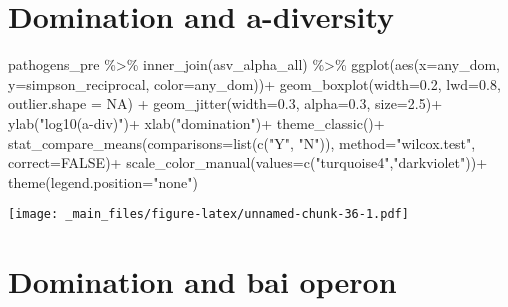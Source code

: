 \documentclass[
]{book}
\newenvironment{Shaded}{\begin{snugshade}}{\end{snugshade}}
\newcommand{\AttributeTok}[1]{\textcolor[rgb]{0.77,0.63,0.00}{#1}}
\newcommand{\ConstantTok}[1]{\textcolor[rgb]{0.00,0.00,0.00}{#1}}
\newcommand{\FloatTok}[1]{\textcolor[rgb]{0.00,0.00,0.81}{#1}}
\newcommand{\FunctionTok}[1]{\textcolor[rgb]{0.00,0.00,0.00}{#1}}
\newcommand{\NormalTok}[1]{#1}
\newcommand{\SpecialCharTok}[1]{\textcolor[rgb]{0.00,0.00,0.00}{#1}}
\newcommand{\StringTok}[1]{\textcolor[rgb]{0.31,0.60,0.02}{#1}}
\begin{document}
\hypertarget{domination-and-a-diversity}{%
\section{Domination and a-diversity}\label{domination-and-a-diversity}}

\begin{Shaded}
\begin{Highlighting}[]
\NormalTok{pathogens\_pre }\SpecialCharTok{\%\textgreater{}\%} \FunctionTok{inner\_join}\NormalTok{(asv\_alpha\_all) }\SpecialCharTok{\%\textgreater{}\%} 
  \FunctionTok{ggplot}\NormalTok{(}\FunctionTok{aes}\NormalTok{(}\AttributeTok{x=}\NormalTok{any\_dom, }\AttributeTok{y=}\NormalTok{simpson\_reciprocal, }\AttributeTok{color=}\NormalTok{any\_dom))}\SpecialCharTok{+}
   \FunctionTok{geom\_boxplot}\NormalTok{(}\AttributeTok{width=}\FloatTok{0.2}\NormalTok{, }\AttributeTok{lwd=}\FloatTok{0.8}\NormalTok{, }\AttributeTok{outlier.shape =} \ConstantTok{NA}\NormalTok{) }\SpecialCharTok{+}
  \FunctionTok{geom\_jitter}\NormalTok{(}\AttributeTok{width=}\FloatTok{0.3}\NormalTok{, }\AttributeTok{alpha=}\FloatTok{0.3}\NormalTok{, }\AttributeTok{size=}\FloatTok{2.5}\NormalTok{)}\SpecialCharTok{+}
  \FunctionTok{ylab}\NormalTok{(}\StringTok{"log10(a{-}div)"}\NormalTok{)}\SpecialCharTok{+}
  \FunctionTok{xlab}\NormalTok{(}\StringTok{"domination"}\NormalTok{)}\SpecialCharTok{+}
  \FunctionTok{theme\_classic}\NormalTok{()}\SpecialCharTok{+}
  \FunctionTok{stat\_compare\_means}\NormalTok{(}\AttributeTok{comparisons=}\FunctionTok{list}\NormalTok{(}\FunctionTok{c}\NormalTok{(}\StringTok{"Y"}\NormalTok{, }\StringTok{"N"}\NormalTok{)),}
                     \AttributeTok{method=}\StringTok{"wilcox.test"}\NormalTok{,}
                     \AttributeTok{correct=}\ConstantTok{FALSE}\NormalTok{)}\SpecialCharTok{+}
  \FunctionTok{scale\_color\_manual}\NormalTok{(}\AttributeTok{values=}\FunctionTok{c}\NormalTok{(}\StringTok{"turquoise4"}\NormalTok{,}\StringTok{"darkviolet"}\NormalTok{))}\SpecialCharTok{+}
  \FunctionTok{theme}\NormalTok{(}\AttributeTok{legend.position=}\StringTok{"none"}\NormalTok{)}
\end{Highlighting}
\end{Shaded}

\texttt{[image: \_main\_files/figure-latex/unnamed-chunk-36-1.pdf]}

\hypertarget{domination-and-bai-operon}{%
\section{Domination and bai operon}\label{domination-and-bai-operon}}
\end{document}
